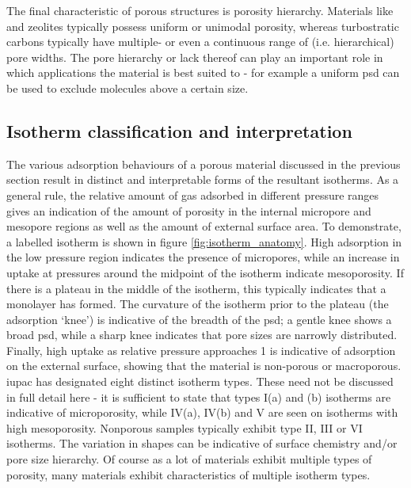 The final characteristic of porous structures is porosity hierarchy. Materials like  and zeolites typically possess uniform or unimodal porosity,\citep{WeitkampZeolites, Siriwardane2005Adsorption, Ding2019Carbon, lin2009hydrogen} whereas \glspl{turbostratic carbon} typically have multiple- or even a continuous range of (i.e. hierarchical) pore widths.\citep{Li2020Hierarchical, Sevilla2014Energy, Xia2008Hierarchical, Balahmar2017Biomass} The pore hierarchy or lack thereof can play an important role in which applications the material is best suited to - for example a uniform \acrfull{psd} can be used to exclude molecules above a certain size.\citep{qian2020mof, reid2001adsorption, Adeniran2014family}

\subsection{Isotherm classification and interpretation}
\label{ss:iso_interpretation}

The various adsorption behaviours of a porous material discussed in the previous section result in distinct and interpretable forms of the resultant isotherms. As a general rule, the relative amount of gas adsorbed in different pressure ranges gives an indication of the amount of porosity in the internal \gls{micropore} and \gls{mesopore} regions as well as the amount of external surface area. To demonstrate, a labelled isotherm is shown in figure \ref{fig:isotherm_anatomy}. High adsorption in the low pressure region indicates the presence of \glspl{micropore}, while an increase in uptake at pressures around the midpoint of the isotherm indicate mesoporosity. If there is a plateau in the middle of the isotherm, this typically indicates that a monolayer has formed. The curvature of the isotherm prior to the plateau (the adsorption `knee') is indicative of the breadth of the \acrshort{psd}; a gentle knee shows a broad \acrshort{psd}, while a sharp knee indicates that pore sizes are narrowly distributed. Finally, high uptake as relative pressure approaches 1 is indicative of adsorption on the external surface, showing that the material is non-porous or macroporous.\citep{Thommes2015Physisorption} \acrshort{iupac} has designated eight distinct isotherm types.\citep{Thommes2015Physisorption, Sing1985} These need not be discussed in full detail here - it is sufficient to state that types I(a) and (b) isotherms are indicative of microporosity, while IV(a), IV(b) and V are seen on isotherms with high mesoporosity. Nonporous samples typically exhibit type II, III or VI isotherms. The variation in shapes can be indicative of surface chemistry and/or pore size hierarchy.\citep{thommes2014physical, monson2012understanding} Of course as a lot of materials exhibit multiple types of porosity, many materials exhibit characteristics of multiple isotherm types.\citep{Thommes2015Physisorption} 

